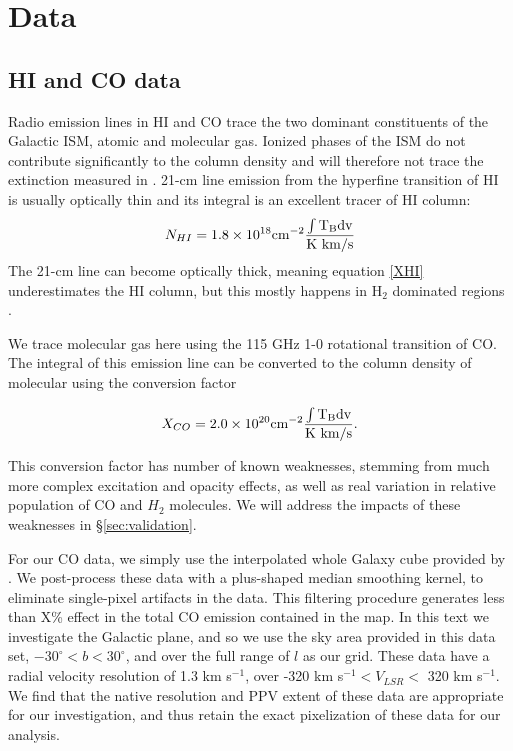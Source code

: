 \section{Data}
\label{sec:data}
\subsection{HI and CO data}

Radio emission lines in HI and CO trace the two dominant constituents of the Galactic ISM, atomic and molecular gas. Ionized phases of the ISM do not contribute significantly to the column density and will therefore not trace the extinction measured in \cite{Green_2015}. 21-cm line emission from the hyperfine transition of HI is usually optically thin and its integral is an excellent tracer of HI column:
\begin{equation}\label{XHI}
N_{HI} = 1.8 \times 10^{18} \rm cm^{-2} \frac{ \int T_B dv}{\rm K~km/s}
\end{equation}
The 21-cm line can become optically thick, meaning equation \ref{XHI} underestimates the HI column, but this mostly happens in H$_2$ dominated regions \cite{Goldsmith_2007}. 

We trace molecular gas here using the 115 GHz 1-0 rotational transition of CO. The integral of this emission line can be converted to the column density of molecular using the conversion factor \citep{Bolatto_2013}

\begin{equation}\label{XCO}
X_{CO} = 2.0 \times 10^{20} \rm cm^{-2} \frac{ \int T_B dv}{\rm K~km/s}.
\end{equation}

This conversion factor has number of known weaknesses, stemming from much more complex excitation and opacity effects, as well as real variation in relative population of CO and $H_2$ molecules. We will address the impacts of these weaknesses in \S \ref{sec:validation}. 

For our CO data, we simply use the interpolated whole Galaxy cube provided by \cite{Dame_2001}. We post-process these data with a plus-shaped median smoothing kernel, to eliminate single-pixel artifacts in the data. This filtering procedure generates less than X\% effect in the total CO emission contained in the map. In this text we investigate the Galactic plane, and so we use the sky area provided in this data set, $-30^\circ < b < 30^\circ$, and over the full range of $l$ as our grid. These data have a radial velocity resolution of 1.3 km s$^{-1}$, over -320 km s$^{-1} < V_{LSR} <$ 320 km s$^{-1}$. We find that the native resolution and PPV extent of these data are appropriate for our investigation, and thus retain the exact pixelization of these data for our analysis. 

